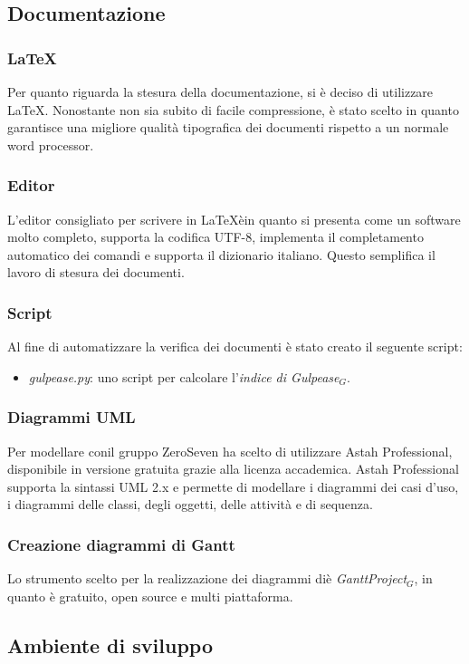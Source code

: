 \subsection{Documentazione}
\subsubsection{\LaTeX}
Per quanto riguarda la stesura della documentazione, si è deciso di utilizzare \LaTeX. Nonostante non sia subito di facile compressione, è stato scelto in quanto garantisce una migliore qualità tipografica dei documenti rispetto a un normale word processor.
\subsubsection{Editor}
 L'editor consigliato per scrivere in \LaTeX èin quanto si presenta come un software molto completo, supporta la codifica UTF-8, implementa il completamento automatico dei comandi e supporta il dizionario italiano. Questo semplifica il lavoro di stesura dei documenti.
 \subsubsection{Script}
Al fine di automatizzare la verifica dei documenti è stato creato il seguente script:
\begin{itemize}
	\item \textit{gulpease.py}: uno script per calcolare l'\textit{indice di Gulpease$_{G}$}.
\end{itemize} 
\subsubsection{Diagrammi UML}
Per modellare conil gruppo ZeroSeven ha scelto di utilizzare Astah Professional, disponibile in versione gratuita grazie alla licenza accademica. Astah Professional supporta la sintassi UML 2.x e permette di modellare i diagrammi dei casi d'uso, i diagrammi delle classi, degli oggetti, delle attività e di sequenza. 
\subsubsection{Creazione diagrammi di Gantt}
Lo strumento scelto per la realizzazione dei diagrammi diè \textit{GanttProject$_{G}$}, in quanto è gratuito, open source e multi piattaforma.
\subsection{Ambiente di sviluppo}
